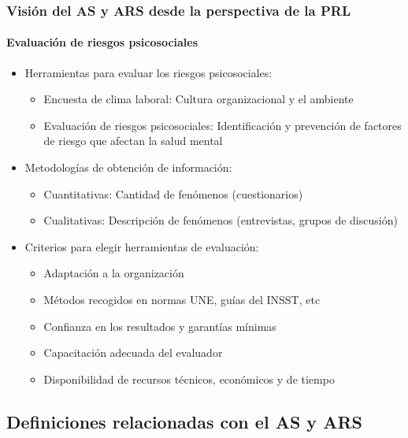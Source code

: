 \documentclass{beamer}
\newcommand{\highlight}[1]{{\color{Blue} #1}}
\begin{document}
    \begin{frame}
        \frametitle{Visión del AS y ARS desde la perspectiva de la PRL}
        \framesubtitle{Evaluación de riesgos psicosociales}
        \begin{itemize}
            \item Herramientas para evaluar los riesgos psicosociales:
            \begin{itemize}
                \item \highlight{Encuesta de clima laboral}: Cultura organizacional y el ambiente
                \item \highlight{Evaluación de riesgos psicosociales}: Identificación y prevención de factores de riesgo que afectan la salud mental
            \end{itemize}
            \item Metodologías de obtención de información:
            \begin{itemize}
                \item \highlight{Cuantitativas}: Cantidad de fenómenos (cuestionarios)
                \item \highlight{Cualitativas}: Descripción de fenómenos (entrevistas, grupos de discusión)
            \end{itemize}
            \item Criterios para elegir herramientas de evaluación:
            \begin{itemize}
                \item Adaptación a la organización
                \item Métodos recogidos en normas UNE, guías del INSST, etc
                \item Confianza en los resultados y garantías mínimas
                \item Capacitación adecuada del evaluador
                \item Disponibilidad de recursos técnicos, económicos y de tiempo
            \end{itemize}
        \end{itemize}
    \end{frame}

    \subsection{Definiciones relacionadas con el AS y ARS}
\end{document}
